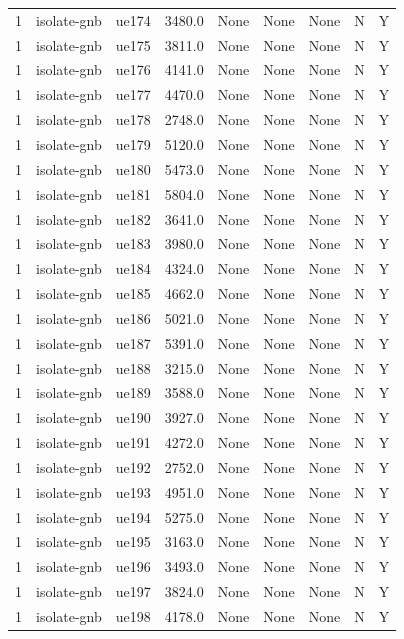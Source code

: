 \begin{table}[ht]
\begin{tabular}{|c|c|c|c|c|c|c|c|c|}
1 & isolate-gnb & ue174 & 3480.0 & None & None & None & N & Y \\
1 & isolate-gnb & ue175 & 3811.0 & None & None & None & N & Y \\
1 & isolate-gnb & ue176 & 4141.0 & None & None & None & N & Y \\
1 & isolate-gnb & ue177 & 4470.0 & None & None & None & N & Y \\
1 & isolate-gnb & ue178 & 2748.0 & None & None & None & N & Y \\
1 & isolate-gnb & ue179 & 5120.0 & None & None & None & N & Y \\
1 & isolate-gnb & ue180 & 5473.0 & None & None & None & N & Y \\
1 & isolate-gnb & ue181 & 5804.0 & None & None & None & N & Y \\
1 & isolate-gnb & ue182 & 3641.0 & None & None & None & N & Y \\
1 & isolate-gnb & ue183 & 3980.0 & None & None & None & N & Y \\
1 & isolate-gnb & ue184 & 4324.0 & None & None & None & N & Y \\
1 & isolate-gnb & ue185 & 4662.0 & None & None & None & N & Y \\
1 & isolate-gnb & ue186 & 5021.0 & None & None & None & N & Y \\
1 & isolate-gnb & ue187 & 5391.0 & None & None & None & N & Y \\
1 & isolate-gnb & ue188 & 3215.0 & None & None & None & N & Y \\
1 & isolate-gnb & ue189 & 3588.0 & None & None & None & N & Y \\
1 & isolate-gnb & ue190 & 3927.0 & None & None & None & N & Y \\
1 & isolate-gnb & ue191 & 4272.0 & None & None & None & N & Y \\
1 & isolate-gnb & ue192 & 2752.0 & None & None & None & N & Y \\
1 & isolate-gnb & ue193 & 4951.0 & None & None & None & N & Y \\
1 & isolate-gnb & ue194 & 5275.0 & None & None & None & N & Y \\
1 & isolate-gnb & ue195 & 3163.0 & None & None & None & N & Y \\
1 & isolate-gnb & ue196 & 3493.0 & None & None & None & N & Y \\
1 & isolate-gnb & ue197 & 3824.0 & None & None & None & N & Y \\
1 & isolate-gnb & ue198 & 4178.0 & None & None & None & N & Y \\

\end{tabular}
\end{table}
